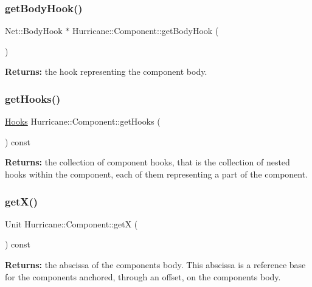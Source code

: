 \subsubsection{\texorpdfstring{get\+Body\+Hook()}{getBodyHook()}}
{\footnotesize\ttfamily Net\+::\+Body\+Hook $\ast$ Hurricane\+::\+Component\+::get\+Body\+Hook (\begin{DoxyParamCaption}{ }\end{DoxyParamCaption})\hspace{0.3cm}{\ttfamily [inline]}}

{\bfseries Returns\+:} the hook representing the component body. \mbox{\label{classHurricane_1_1Component_a1fc513b9465b2b8c22f41d56bf775594}} 
\subsubsection{\texorpdfstring{get\+Hooks()}{getHooks()}}
{\footnotesize\ttfamily \mbox{\hyperlink{namespaceHurricane_a9dcd9b74dc5e2b51bec7a13c25807e02}{Hooks}} Hurricane\+::\+Component\+::get\+Hooks (\begin{DoxyParamCaption}{ }\end{DoxyParamCaption}) const\hspace{0.3cm}{\ttfamily [virtual]}}

{\bfseries Returns\+:} the collection of component hooks, that is the collection of nested hooks within the component, each of them representing a part of the component. \mbox{\label{classHurricane_1_1Component_a0f8299ed73705fd4fbf56589dcc7e074}} 
\subsubsection{\texorpdfstring{get\+X()}{getX()}}
{\footnotesize\ttfamily Unit Hurricane\+::\+Component\+::getX (\begin{DoxyParamCaption}{ }\end{DoxyParamCaption}) const\hspace{0.3cm}{\ttfamily [pure virtual]}}

{\bfseries Returns\+:} the abscissa of the component\textquotesingle{}s body. This abscissa is a reference base for the components anchored, through an offset, on the component\textquotesingle{}s body. 

